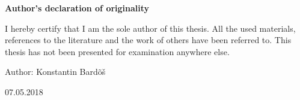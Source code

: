 
\begin{titlepage}


\vspace*{2cm}

\begin{center}
{\Large \textbf{Author’s declaration of originality}}
\end{center}

\vspace*{1cm}

I hereby certify that I am the sole author of this thesis. All the used materials, references to the literature and the work of others have been referred to. This thesis has not been presented for examination anywhere else.

\vspace{3mm}

\begin{flushleft}
Author: Konstantin Bardõš

\vspace{3mm}

07.05.2018

\end{flushleft}
        
\end{titlepage}